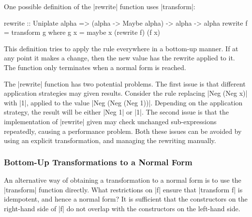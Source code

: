 One possible definition of the |rewrite| function uses |transform|:

\begin{code}
rewrite :: Uniplate alpha => (alpha -> Maybe alpha) -> alpha -> alpha
rewrite f = transform g
    where g x = maybe x (rewrite f) (f x)
\end{code}

This definition tries to apply the rule everywhere in a bottom-up manner. If at any point it makes a change, then the new value has the rewrite applied to it. The function only terminates when a normal form is reached.

The |rewrite| function has two potential problems. The first issue is that different application strategies may given results. Consider the rule replacing |Neg (Neg x)| with |1|, applied to the value |Neg (Neg (Neg 1))|. Depending on the application strategy, the result will be either |Neg 1| or |1|. The second issue is that the implementation of |rewrite| given may check unchanged sub-expressions repeatedly, causing a performance problem. Both these issues can be avoided by using an explicit transformation, and managing the rewriting manually.

\subsubsection{Bottom-Up Transformations to a Normal Form}
\label{secU:rewrite_bottom}

An alternative way of obtaining a transformation to a normal form is to use the |transform| function directly. What restrictions on |f| ensure that |transform f| is idempotent, and hence a normal form? It is sufficient that the constructors on the right-hand side of |f| do not overlap with the constructors on the left-hand side.

